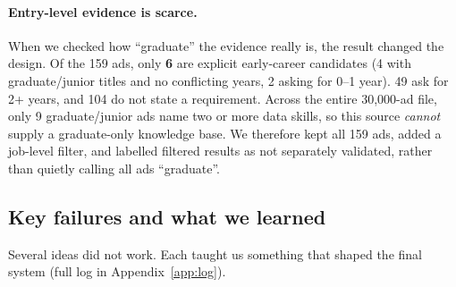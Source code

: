 \paragraph{Entry-level evidence is scarce.} When we checked how ``graduate'' the evidence really is, the result changed the design. Of the 159 ads, only \textbf{6} are explicit early-career candidates (4 with graduate/junior titles and no conflicting years, 2 asking for 0--1 year). 49 ask for 2+ years, and 104 do not state a requirement. Across the entire 30,000-ad file, only 9 graduate/junior ads name two or more data skills, so this source \emph{cannot} supply a graduate-only knowledge base. We therefore kept all 159 ads, added a job-level filter, and labelled filtered results as not separately validated, rather than quietly calling all ads ``graduate''.

\subsection{Key failures and what we learned}\label{sec:fail}

Several ideas did not work. Each taught us something that shaped the final system (full log in Appendix~\ref{app:log}).

